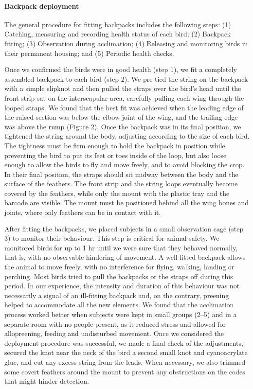 \documentclass[11pt,a4paper,oneside]{article}
\begin{document}
\paragraph{Backpack deployment}
The general procedure for fitting backpacks includes the following steps: (1) Catching, measuring and recording health status of each bird; (2) Backpack fitting; (3) Observation during acclimation; (4) Releasing and monitoring birds in their permanent housing; and (5) Periodic health checks.

Once we confirmed the birds were in good health (step 1), we fit a completely assembled backpack to each bird (step 2). We pre‐tied the string on the backpack with a simple slipknot and then pulled the straps over the bird's head until the front strip sat on the interscapular area, carefully pulling each wing through the looped straps. We found that the best fit was achieved when the leading edge of the raised section was below the elbow joint of the wing, and the trailing edge was above the rump (Figure 2). Once the backpack was in its final position, we tightened the string around the body, adjusting according to the size of each bird. The tightness must be firm enough to hold the backpack in position while preventing the bird to put its feet or toes inside of the loop, but also loose enough to allow the birds to fly and move freely, and to avoid blocking the crop. In their final position, the straps should sit midway between the body and the surface of the feathers. The front strip and the string loops eventually become covered by the feathers, while only the mount with the plastic tray and the barcode are visible. The mount must be positioned behind all the wing bones and joints, where only feathers can be in contact with it.

After fitting the backpacks, we placed subjects in a small observation cage (step 3) to monitor their behaviour. This step is critical for animal safety. We monitored birds for up to 1 hr until we were sure that they behaved normally, that is, with no observable hindering of movement. A well‐fitted backpack allows the animal to move freely, with no interference for flying, walking, landing or perching. Most birds tried to pull the backpacks or the straps off during this period. In our experience, the intensity and duration of this behaviour was not necessarily a signal of an ill‐fitting backpack and, on the contrary, preening helped to accommodate all the new elements. We found that the acclimation process worked better when subjects were kept in small groups (2–5) and in a separate room with no people present, as it reduced stress and allowed for allopreening, feeding and undisturbed movement. Once we considered the deployment procedure was successful, we made a final check of the adjustments, secured the knot near the neck of the bird a second small knot and cyanoacrylate glue, and cut any excess string from the leads. When necessary, we also trimmed some covert feathers around the mount to prevent any obstructions on the codes that might hinder detection.
\end{document}
